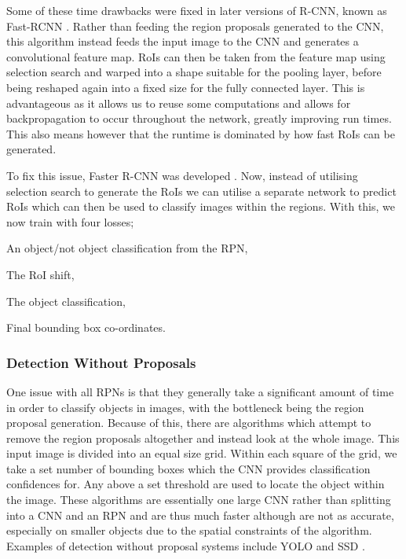 Some of these time drawbacks were fixed in later versions of R-CNN, known as Fast-RCNN \cite{girshick_fast_2015}. Rather than feeding the region proposals generated to the CNN, this algorithm instead feeds the input image to the CNN and generates a convolutional feature map. RoIs can then be taken from the feature map using selection search and warped into a shape suitable for the pooling layer, before being reshaped again into a fixed size for the fully connected layer. This is advantageous as it allows us to reuse some computations and allows for backpropagation to occur throughout the network, greatly improving run times.  This also means however that the runtime is dominated by how fast RoIs can be generated. 

To fix this issue, Faster R-CNN was developed \cite{ren_faster_2015}. Now, instead of utilising selection search to generate the RoIs we can utilise a separate network to predict RoIs which can then be used to classify images within the regions. With this, we now train with four losses; 

\begin{enumerate*}
	\item An object/not object classification from the RPN,
	\item The RoI shift,
	\item The object classification,
	\item Final bounding box co-ordinates.
\end{enumerate*}

\subsubsection{Detection Without Proposals}\label{ch:Background,sec:objectDetection,sub:noProposals}

One issue with all RPNs is that they generally take a significant amount of time in order to classify objects in images, with the bottleneck being the region proposal generation. Because of this, there are algorithms which attempt to remove the region proposals altogether and instead look at the whole image. This input image is divided into an equal size grid. Within each square of the grid, we take a set number of bounding boxes which the CNN provides classification confidences for. Any above a set threshold are used to locate the object within the image. These algorithms are essentially one large CNN rather than splitting into a CNN and an RPN and are thus much faster although are not as accurate, especially on smaller objects due to the spatial constraints of the algorithm. Examples of detection without proposal systems include YOLO \cite{redmon_you_2016} and SSD \cite{liu_ssd:_2016}. 


